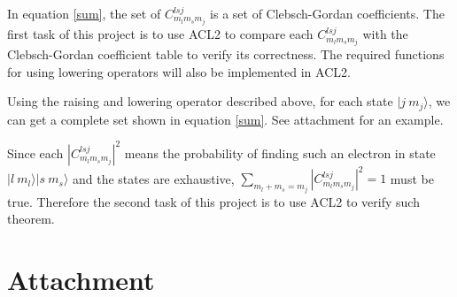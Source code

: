 \documentclass[12pt]{article}
\begin{document}
\begin{spacing}{1.0}
In equation \ref{sum}, the set of $C_{m_l m_s m_j}^{l s j}$ is a set of Clebsch-Gordan coefficients. The first task of this project is to use ACL2 to compare each $C_{m_l m_s m_j}^{l s j}$ with the Clebsch-Gordan coefficient table to verify its correctness. The required functions for using lowering operators will also be implemented in ACL2.

Using the raising and lowering operator described above, for each state $|j\ m_j \rangle$, we can get a complete set shown in equation \ref{sum}. See attachment for an example.

Since each $|C_{m_l m_s m_j}^{l s j}|^2$ means the probability of finding such an electron in state $|l\ m_l \rangle |s\ m_s \rangle$ and the states are exhaustive, $\sum\limits_{m_l+m_s=m_j} \left| C_{m_l m_s m_j}^{l s j} \right|^2=1$ must be true. Therefore the second task of this project is to use ACL2 to verify such theorem.

\clearpage

\end{spacing}

\section*{Attachment}
\end{document}
